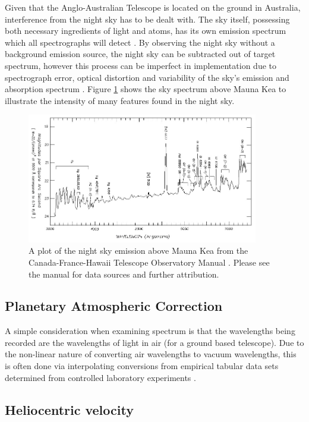 \documentclass[titlesmallcaps, examinerscopy, copyrightpage]{uqthesis}
\begin{document}
Given that the Anglo-Australian Telescope is located on the ground in Australia, interference from the night sky has to be dealt with. The sky itself, possessing both necessary ingredients of light and atoms, has its own emission spectrum which all spectrographs will detect \cite{Meinel1950Emission}. By observing the night sky without a background emission source, the night sky can be subtracted out of target spectrum, however this process can be imperfect in implementation due to spectrograph error, optical distortion and variability of the sky's emission and absorption spectrum \cite{Kelson2003Optimal}. Figure \ref{fig:night} shows the sky spectrum above Mauna Kea to illustrate the intensity of many features found in the night sky.

\begin{figure}[ht!]
\includegraphics[width=0.9\textwidth]{images/om-nskyvis.jpg} 
\centering
\caption{A plot of the night sky emission above Mauna Kea from the Canada-France-Hawaii Telescope Observatory Manual \cite{night}. Please see the manual for data sources and further attribution.}
\label{fig:night}
\end{figure}

\subsection{Planetary Atmospheric Correction}

A simple consideration when examining spectrum is that the wavelengths being recorded are the wavelengths of light in air (for a ground based telescope). Due to the non-linear nature of converting air wavelengths to vacuum wavelengths, this is often done via interpolating conversions from empirical tabular data sets determined from controlled laboratory experiments \cite{morton1991atomic}.

\subsection{Heliocentric velocity}
\end{document}
